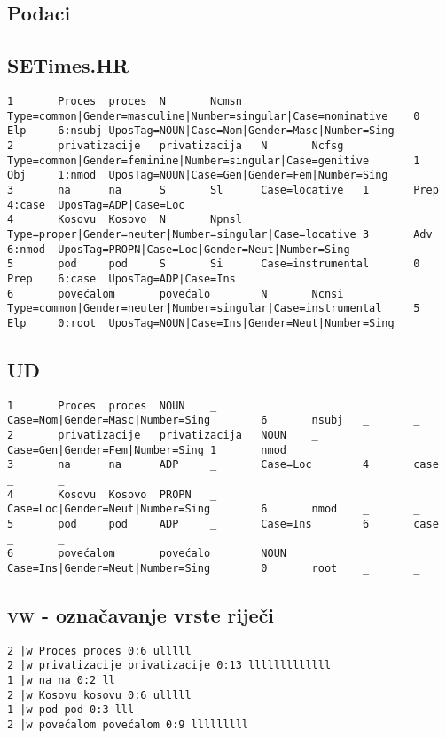 \begin{appendix}
\chapter{Podaci}\label{appendix:data}
\section{SETimes.HR}
\begin{lstlisting}[basicstyle=\scriptsize\ttfamily]
1       Proces  proces  N       Ncmsn   Type=common|Gender=masculine|Number=singular|Case=nominative    0       Elp     6:nsubj UposTag=NOUN|Case=Nom|Gender=Masc|Number=Sing
2       privatizacije   privatizacija   N       Ncfsg   Type=common|Gender=feminine|Number=singular|Case=genitive       1       Obj     1:nmod  UposTag=NOUN|Case=Gen|Gender=Fem|Number=Sing
3       na      na      S       Sl      Case=locative   1       Prep    4:case  UposTag=ADP|Case=Loc
4       Kosovu  Kosovo  N       Npnsl   Type=proper|Gender=neuter|Number=singular|Case=locative 3       Adv     6:nmod  UposTag=PROPN|Case=Loc|Gender=Neut|Number=Sing
5       pod     pod     S       Si      Case=instrumental       0       Prep    6:case  UposTag=ADP|Case=Ins
6       povećalom       povećalo        N       Ncnsi   Type=common|Gender=neuter|Number=singular|Case=instrumental     5       Elp     0:root  UposTag=NOUN|Case=Ins|Gender=Neut|Number=Sing
\end{lstlisting}

\section{UD}
\begin{lstlisting}[basicstyle=\scriptsize\ttfamily]
1       Proces  proces  NOUN    _       Case=Nom|Gender=Masc|Number=Sing        6       nsubj   _       _
2       privatizacije   privatizacija   NOUN    _       Case=Gen|Gender=Fem|Number=Sing 1       nmod    _       _
3       na      na      ADP     _       Case=Loc        4       case    _       _
4       Kosovu  Kosovo  PROPN   _       Case=Loc|Gender=Neut|Number=Sing        6       nmod    _       _
5       pod     pod     ADP     _       Case=Ins        6       case    _       _
6       povećalom       povećalo        NOUN    _       Case=Ins|Gender=Neut|Number=Sing        0       root    _       _
\end{lstlisting}

\section{\textsc{vw} - označavanje vrste riječi}
\begin{lstlisting}[basicstyle=\scriptsize\ttfamily]
2 |w Proces proces 0:6 ulllll
2 |w privatizacije privatizacije 0:13 lllllllllllll
1 |w na na 0:2 ll
2 |w Kosovu kosovu 0:6 ulllll
1 |w pod pod 0:3 lll
2 |w povećalom povećalom 0:9 lllllllll
\end{lstlisting}

\end{appendix}
